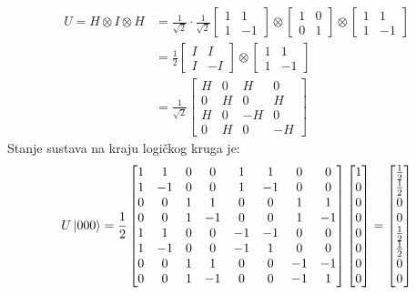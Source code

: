 \begin{align*}
U = H \otimes I \otimes H &= \frac{1}{\sqrt{2}} \cdot \frac{1}{\sqrt{2}}
\begin{bmatrix} 1 & 1 \\ 1 & -1 \end{bmatrix} \otimes
\begin{bmatrix} 1 & 0 \\ 0 & 1 \end{bmatrix} \otimes
\begin{bmatrix} 1 & 1 \\ 1 & -1 \end{bmatrix} \\
&= \frac{1}{2}
\begin{bmatrix} I & I \\ I & -I \end{bmatrix} \otimes
\begin{bmatrix} 1 & 1 \\ 1 & -1 \end{bmatrix} \\
&= \frac{1}{\sqrt{2}} \begin{bmatrix} H & 0 & H & 0 \\ 0 & H & 0 & H \\ H & 0 & -H & 0 \\ 0 & H & 0 & -H \end{bmatrix}
\end{align*}
Stanje sustava na kraju logičkog kruga je:
\[
U\ket{000} = \frac{1}{2}
\begin{bmatrix}
1 & 1 & 0 & 0 & 1 & 1 & 0 & 0 \\
1 & -1 & 0 & 0 & 1 & -1 & 0 & 0 \\
0 & 0 & 1 & 1 & 0 & 0 & 1 & 1 \\
0 & 0 & 1 & -1 & 0 & 0 & 1 & -1 \\
1 & 1 & 0 & 0 & -1 & -1 & 0 & 0 \\
1 & -1 & 0 & 0 & -1 & 1 & 0 & 0 \\
0 & 0 & 1 & 1 & 0 & 0 & -1 & -1 \\
0 & 0 & 1 & -1 & 0 & 0 & -1 & 1
\end{bmatrix}
\begin{bmatrix}
1 \\ 0 \\ 0 \\ 0 \\ 0 \\ 0 \\ 0 \\ 0 
\end{bmatrix}
= \begin{bmatrix}
\frac{1}{2} \\ \frac{1}{2} \\ 0 \\ 0 \\ \frac{1}{2} \\ \frac{1}{2} \\ 0 \\ 0 
\end{bmatrix}
\]
